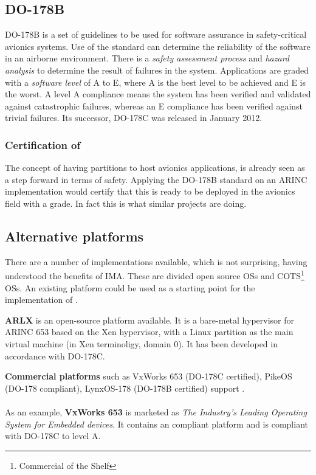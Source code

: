\subsection{DO-178B}
DO-178B\cite{do178b_wiki} is a set of guidelines to be used for
software assurance in safety-critical avionics systems.
Use of the standard can determine the reliability of the software in an airborne environment.
There is a \textit{safety assessment process} and \textit{hazard analysis} to determine the result of failures in the system.
Applications are graded with a \textit{software level} of A to E,
where A is the best level to be achieved and E is the worst.
A level A compliance means the system has been verified and validated against catastrophic failures,
whereas an E compliance has been verified against trivial failures.
Its successor, DO-178C\cite{do178c_wiki} was released in January 2012.

\subsubsection{Certification of \arinc{}}
The concept of having partitions
to host avionics applications, is already seen as a step
forward in terms of safety.
Applying the DO-178B standard on an ARINC implementation would certify
that this is ready to be deployed in the avionics field with a grade.
In fact this is what similar projects are doing.

\subsection{Alternative \arinc{} platforms}
There are a number of \arinc{} implementations available, which is not
surprising, having understood the benefits of IMA.
These are divided open source OSs and COTS\footnote{Commercial of the Shelf} OSs.
An existing platform could be used as a starting point for
the implementation of \OSname{}.

\textbf{ARLX}\cite{arlx}
is an open-source platform available. It is a bare-metal hypervisor
for ARINC 653 based on the Xen hypervisor, with a Linux partition as the main
virtual machine (in Xen terminoligy, domain 0).
It has been developed in accordance with DO-178C.

\textbf{Commercial platforms}
such as VxWorks 653 (DO-178C certified)\cite{vxworks},
PikeOS (DO-178 compliant)\cite{pikeos},
LynxOS-178 (DO-178B certified)\cite{linxos}
support \arinc{}.
\\\\
As an example, \textbf{VxWorks 653}
is marketed as \textit{The Industry's Leading Operating System for Embedded devices}\cite{vxworks}.
It contains an \arinc{} compliant platform and is compliant with DO-178C to level A.

